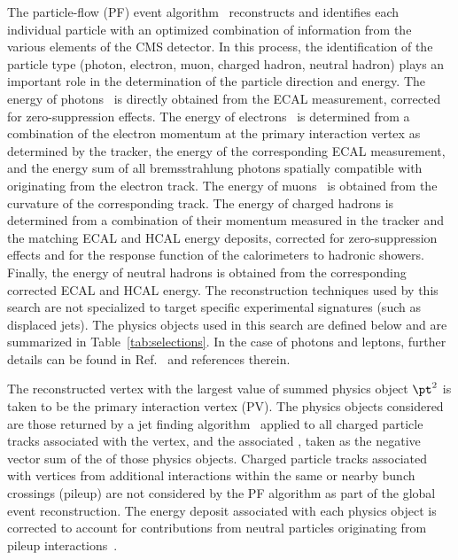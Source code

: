 The particle-flow (PF) event algorithm~\cite{CMS-PRF-14-001}
reconstructs and identifies each individual particle with an optimized
combination of information from the various elements of the CMS
detector. In this process, the identification of the particle type
(photon, electron, muon, charged hadron, neutral hadron) plays an
important role in the determination of the particle direction and
energy. The energy of photons~\cite{Khachatryan:2015iwa} is directly
obtained from the ECAL measurement, corrected for zero-suppression
effects. The energy of electrons~\cite{Khachatryan:2015hwa} is
determined from a combination of the electron momentum at the primary
interaction vertex as determined by the tracker, the energy of the
corresponding ECAL measurement, and the energy sum of all
bremsstrahlung photons spatially compatible with originating from the
electron track. The energy of muons~\cite{Chatrchyan:2012xi} is
obtained from the curvature of the corresponding track. The energy of
charged hadrons is determined from a combination of their momentum
measured in the tracker and the matching ECAL and HCAL energy
deposits, corrected for zero-suppression effects and for the response
function of the calorimeters to hadronic showers. Finally, the energy
of neutral hadrons is obtained from the corresponding corrected ECAL
and HCAL energy. The reconstruction techniques used by this search are
not specialized to target specific experimental signatures (such as
displaced jets). The physics objects used in this search are defined
below and are summarized in Table~\ref{tab:selections}. In the case of
photons and leptons, further details can be found in
Ref.~\cite{Khachatryan:2016dvc} and references therein.

The reconstructed vertex with the largest value of summed physics
object $\pt^2$ is taken to be the primary {\Pp\Pp} interaction vertex
(PV). The physics objects considered are those returned by a jet
finding algorithm~\cite{Cacciari:2008gp, Cacciari:2011ma} applied to
all charged particle tracks associated with the vertex, and the
associated \ptmiss, taken as the negative vector sum of the \pt of
those physics objects. Charged particle tracks associated with
vertices from additional {\Pp\Pp} interactions within the same or
nearby bunch crossings (pileup) are not considered by the PF algorithm
as part of the global event reconstruction. The energy deposit
associated with each physics object %
is corrected to account for contributions from neutral particles
originating from pileup interactions~\cite{Cacciari:2007fd}.

